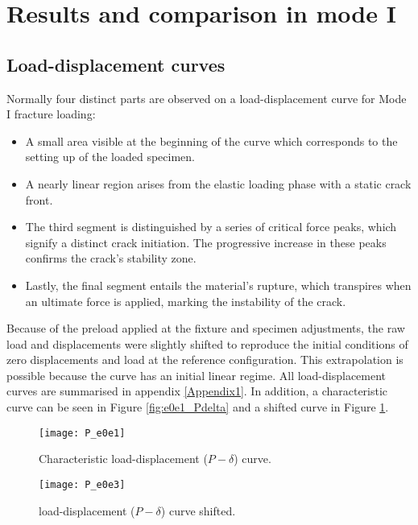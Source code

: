 \section{Results and comparison in mode I}

\subsection{Load-displacement curves}

Normally four distinct parts are observed on a load-displacement curve for Mode I fracture loading:

\begin{itemize}
	\item A small area visible at the beginning of the curve which corresponds to the setting up of the loaded specimen. 
	\item A nearly linear region arises from the elastic loading phase with a static crack front.
	\item The third segment is distinguished by a series of critical force peaks, which signify a distinct crack initiation. The progressive increase in these peaks confirms the crack's stability zone.
	\item Lastly, the final segment entails the material's rupture, which transpires when an ultimate force is applied, marking the instability of the crack.
\end{itemize}

Because of the preload applied at the fixture and specimen adjustments, the raw load and displacements were slightly shifted to reproduce the initial conditions of zero displacements and load at the reference configuration. This extrapolation is possible because the curve has an initial linear regime. All load-displacement curves are summarised in appendix \ref{Appendix1}. In addition, a characteristic curve can be seen in Figure \ref{fig:e0e1_Pdelta} and a shifted curve in Figure \ref{fig:e0e3_Pdelta}.


\begin{figure}[htp]
	\begin{minipage}[c]{.46\linewidth}
		\centering
		\texttt{[image: P\_e0e1]}
		\caption{Characteristic load-displacement ($P-\delta$) curve.}
		\label{fig:e0e1_Pdelta}
	\end{minipage}
	\hfill%
	\begin{minipage}[c]{.46\linewidth}
		\centering
		\texttt{[image: P\_e0e3]}
		\caption{load-displacement ($P-\delta$) curve shifted.}
		\label{fig:e0e3_Pdelta}
	\end{minipage}
\end{figure}


